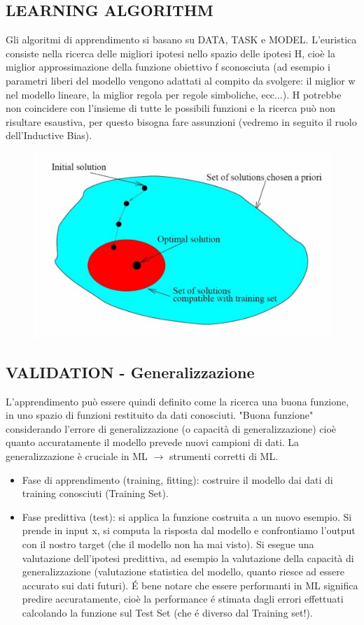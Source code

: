 \documentclass{article}
\begin{document}
\subsection{LEARNING ALGORITHM}
Gli algoritmi di apprendimento si basano su DATA, TASK e MODEL. L'euristica consiste nella ricerca delle migliori ipotesi nello spazio delle ipotesi H, cioè la miglior approssimazione della funzione obiettivo f sconosciuta (ad esempio i parametri liberi del modello vengono adattati al compito da svolgere: il miglior w nel modello lineare, la miglior regola per regole simboliche, ecc...). H potrebbe non coincidere con l'insieme di tutte le possibili funzioni e la ricerca può non risultare esaustiva, per questo bisogna fare assunzioni (vedremo in seguito il ruolo dell'Inductive Bias).
\begin{figure}[H]
    \centering
    \includegraphics[scale=0.4]{Images/learningalgo.png}
\end{figure}

\subsection{VALIDATION - Generalizzazione}
L'apprendimento può essere quindi definito come la ricerca una buona funzione, in uno spazio di funzioni restituito da dati conosciuti. "Buona funzione" considerando l'errore di generalizzazione (o capacità di generalizzazione) cioè quanto accuratamente il modello prevede nuovi campioni di dati. La generalizzazione è cruciale in ML $\rightarrow$ strumenti corretti di ML.
\begin{itemize}
    \item Fase di apprendimento (training, fitting): costruire il modello dai dati di training conosciuti (Training Set).
    \item Fase predittiva (test): si applica la funzione costruita a un nuovo esempio. Si prende in input x, si computa la risposta dal modello e confrontiamo l'output con il nostro target (che il modello non ha mai visto). Si esegue una valutazione dell'ipotesi predittiva, ad esempio la valutazione della capacità di generalizzazione (valutazione statistica del modello, quanto riesce ad essere accurato sui dati futuri). É bene notare che essere performanti in ML significa predire accuratamente, cioè la performance é stimata dagli errori effettuati calcolando la funzione sul Test Set (che é diverso dal Training set!).
\end{itemize}
\end{document}
